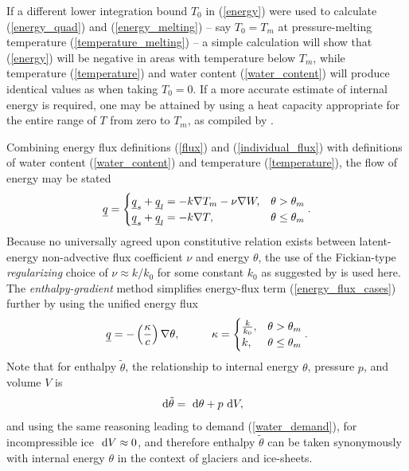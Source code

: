 If a different lower integration bound $T_0$ in (\ref{energy}) were used to calculate (\ref{energy_quad}) and (\ref{energy_melting}) -- say $T_0 = T_m$ at pressure-melting temperature (\ref{temperature_melting}) -- a simple calculation will show that (\ref{energy}) will be negative in areas with temperature below $T_m$, while temperature (\ref{temperature}) and water content (\ref{water_content}) will produce identical values as when taking $T_0 = 0$.  If a more accurate estimate of internal energy is required, one may be attained by using a heat capacity appropriate for the entire range of $T$ from zero to $T_m$, as compiled by \citet{yen_1981}.

Combining energy flux definitions (\ref{flux}) and (\ref{individual_flux}) with definitions of water content (\ref{water_content}) and temperature (\ref{temperature}), the flow of energy may be stated
\begin{align}
  \label{energy_flux_cases}
  \underline{q} = 
  \begin{cases}
    \underline{q}_s + \underline{q}_l = - k \nabla T_m - \nu \nabla W, & \theta > \theta_m \\
    \underline{q}_s + \underline{q}_l = - k \nabla T, & \theta \le \theta_m
  \end{cases}.
\end{align}
Because no universally agreed upon constitutive relation exists between latent-energy non-advective flux coefficient $\nu$ and energy $\theta$, the use of the Fickian-type \emph{regularizing} choice of $\nu \approx k / k_0$ for some constant $k_0$ as suggested by \citet{aschwanden_2009} is used here.
The   \emph{enthalpy-gradient} method \citep{pham_1995, aschwanden_2009, aschwanden_2012} simplifies energy-flux term (\ref{energy_flux_cases}) further by using the unified energy flux
\begin{align}
  \label{enthalpy_grad}
  \rankone{q} = - \left( \frac{\kappa}{c} \right) \nabla \theta, \hspace{10mm}
  \kappa =
  \begin{cases}
    \frac{k}{k_0}, & \theta > \theta_m \\
    k,             & \theta \leq \theta_m
  \end{cases}.
\end{align}
Note that for enthalpy $\tilde{\theta}$, the relationship to internal energy $\theta$, pressure $p$, and volume $V$ is \citep{yen_1981}
\begin{align}
  \label{enthalpy}
  \ \mathrm{d}\tilde{\theta} &= \ \mathrm{d}\theta + p \ \mathrm{d}V,
\end{align}
and using the same reasoning leading to demand (\ref{water_demand}), for incompressible ice $\ \mathrm{d}V \approx 0$, and therefore enthalpy $\tilde{\theta}$ can be taken synonymously with internal energy $\theta$ in the context of glaciers and ice-sheets.

